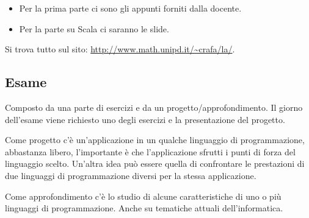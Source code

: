 \begin{itemize}
	\item Per la prima parte ci sono gli appunti forniti dalla docente.
	\item Per la parte su Scala ci saranno le slide.
\end{itemize}

Si trova tutto sul sito: \url{http://www.math.unipd.it/~crafa/la/}.

\subsection{Esame}

Composto da una parte di esercizi e da un progetto/approfondimento. Il giorno dell'esame viene richiesto uno degli esercizi e la presentazione del progetto.

Come progetto c'è un'applicazione in un qualche linguaggio di programmazione, abbastanza libero, l'importante è che l'applicazione sfrutti i punti di forza del linguaggio scelto. Un'altra idea può essere quella di confrontare le prestazioni di due linguaggi di programmazione diversi per la stessa applicazione.

Come approfondimento c'è lo studio di alcune caratteristiche di uno o più linguaggi di programmazione. Anche su tematiche attuali dell'informatica.


